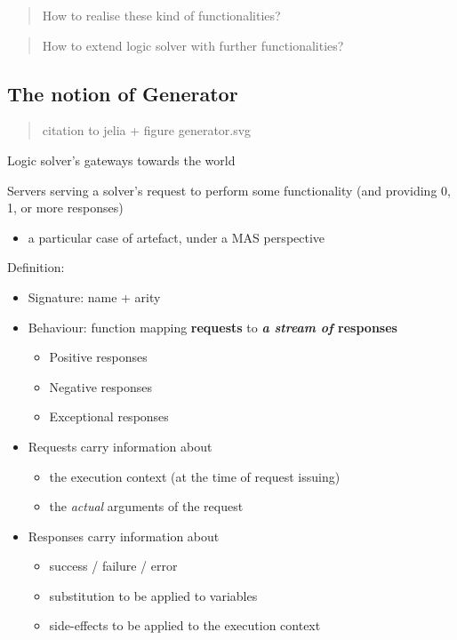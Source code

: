 \begin{quote}
How to realise these kind of functionalities?
\end{quote}

\begin{quote}
How to extend logic solver with further functionalities?
\end{quote}

\hypertarget{the-notion-of-generator}{%
\subsection{The notion of Generator}\label{the-notion-of-generator}}

\begin{quote}
citation to jelia + figure generator.svg
\end{quote}

Logic solver's gateways towards the world

Servers serving a solver's request to perform some functionality (and
providing 0, 1, or more responses)

\begin{itemize}
\tightlist
\item
  a particular case of artefact, under a MAS perspective
\end{itemize}

Definition:

\begin{itemize}
\item
  Signature: name + arity
\item
  Behaviour: function mapping \textbf{requests} to \textbf{\emph{a
  stream of} responses}

  \begin{itemize}
  \tightlist
  \item
    Positive responses
  \item
    Negative responses
  \item
    Exceptional responses
  \end{itemize}
\item
  Requests carry information about

  \begin{itemize}
  \tightlist
  \item
    the execution context (at the time of request issuing)
  \item
    the \emph{actual} arguments of the request
  \end{itemize}
\item
  Responses carry information about

  \begin{itemize}
  \tightlist
  \item
    success / failure / error
  \item
    substitution to be applied to variables
  \item
    side-effects to be applied to the execution context
  \end{itemize}
\end{itemize}

